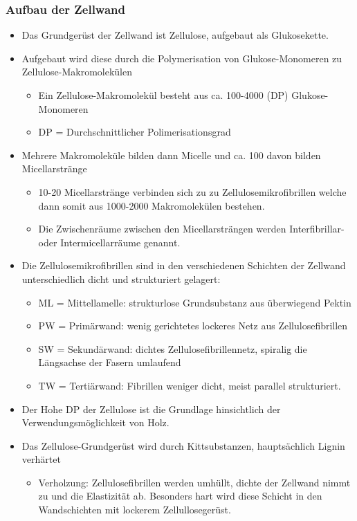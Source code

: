 \documentclass[12pt]{article}
\begin{document}
\subsubsection{Aufbau der Zellwand}
\begin{itemize}
  \item Das Grundgerüst der Zellwand ist Zellulose, aufgebaut als Glukosekette.
  \item Aufgebaut wird diese durch die Polymerisation von Glukose-Monomeren zu
        Zellulose-Makromolekülen 
        \begin{itemize}
          \item Ein Zellulose-Makromolekül besteht aus ca. 100-4000 (DP)
                Glukose-Monomeren
          \item DP = Durchschnittlicher Polimerisationsgrad
        \end{itemize}
   \item Mehrere Makromoleküle bilden dann Micelle und ca. 100 davon bilden
         Micellarstränge
         \begin{itemize}
           \item 10-20 Micellarstränge verbinden sich zu zu 
                 Zellulosemikrofibrillen welche dann somit aus 1000-2000
                 Makromolekülen bestehen.
           \item Die Zwischenräume zwischen den Micellarsträngen werden
                 Interfibrillar- oder Intermicellarräume genannt.
         \end{itemize}
    \item Die Zellulosemikrofibrillen sind in den verschiedenen Schichten der Zellwand
          unterschiedlich dicht und strukturiert gelagert:
          \begin{itemize}
            \item ML = Mittellamelle: strukturlose Grundsubstanz aus überwiegend Pektin
            \item PW = Primärwand: wenig gerichtetes lockeres Netz aus Zellulosefibrillen
            \item SW = Sekundärwand: dichtes Zellulosefibrillennetz, spiralig
                  die Längsachse der Fasern umlaufend
            \item TW = Tertiärwand: Fibrillen weniger dicht, meist parallel strukturiert.
          \end{itemize}
     \item Der Hohe DP der Zellulose ist die Grundlage hinsichtlich der
           Verwendungsmöglichkeit von Holz.
     \item Das Zellulose-Grundgerüst wird durch Kittsubstanzen, hauptsächlich Lignin
           verhärtet
           \begin{itemize}
             \item Verholzung: Zellulosefibrillen werden umhüllt, dichte der
                   Zellwand nimmt zu und die Elastizität ab. Besonders hart wird
                   diese Schicht in den Wandschichten mit lockerem
                   Zellullosegerüst.
           \end{itemize}
           
     \end{itemize}
\end{document}
